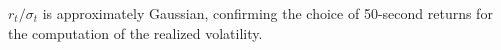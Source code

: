 $r_t / \sigma_t$ is approximately Gaussian, confirming the choice of
50-second returns for the computation of the realized volatility.

